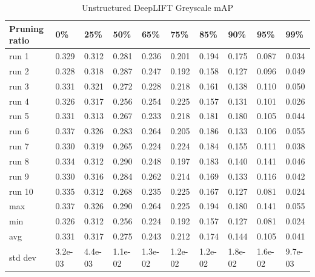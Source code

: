 \documentclass[journal,onecolumn,12pt]{IEEEtran}
\begin{document}
\begin{table}[htbp]
    \caption{Unstructured DeepLIFT Greyscale mAP}
    \begin{center}
    \begin{tabular}{ |p{2cm}|p{1cm}|p{1cm}|p{1cm}|p{1cm}|p{1cm}|p{1cm}|p{1cm}|p{1cm}|p{1cm}|  }
     \hline
     Pruning ratio  & 0\% & 25\%& 50\%& 65\%& 75\%& 85\%& 90\%& 95\%& 99\%\\
     \hline
     run 1&0.329&0.312&0.281&0.236&0.201&0.194&0.175&0.087&0.034\\
     run 2&0.328&0.318&0.287&0.247&0.192&0.158&0.127&0.096&0.049\\
     run 3&0.331&0.321&0.272&0.228&0.218&0.161&0.138&0.110&0.050\\
     run 4&0.326&0.317&0.256&0.254&0.225&0.157&0.131&0.101&0.026\\
     run 5&0.331&0.313&0.267&0.233&0.218&0.181&0.180&0.105&0.044\\
     run 6&0.337&0.326&0.283&0.264&0.205&0.186&0.133&0.106&0.055\\
     run 7&0.330&0.319&0.265&0.224&0.224&0.184&0.155&0.111&0.038\\
     run 8&0.334&0.312&0.290&0.248&0.197&0.183&0.140&0.141&0.046\\
     run 9&0.330&0.316&0.284&0.262&0.214&0.169&0.133&0.116&0.042\\
     run 10&0.335&0.312&0.268&0.235&0.225&0.167&0.127&0.081&0.024\\
     \hline
        max     &0.337&0.326&0.290&0.264&0.225&0.194&0.180&0.141&0.055\\
        min     &0.326&0.312&0.256&0.224&0.192&0.157&0.127&0.081&0.024\\
        avg     &0.331&0.317&0.275&0.243&0.212&0.174&0.144&0.105&0.041\\
        std dev &3.2e-03&4.4e-03&1.1e-02&1.3e-02&1.2e-02&1.2e-02&1.8e-02&1.6e-02&9.7e-03\\
     \hline
    \end{tabular}
    \end{center}
    \label{tab:a5}
\end{table}
\end{document}
